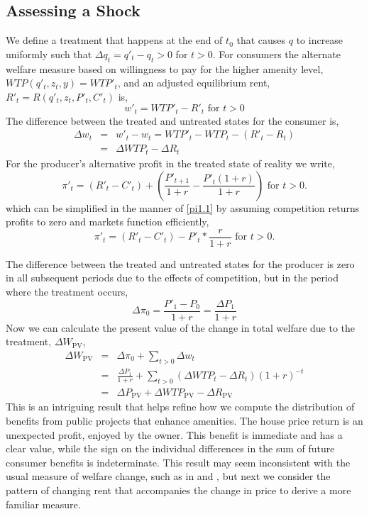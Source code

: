 \documentclass[ecta,nameyear,draft]{econsocart}
\theoremstyle{plain}
\theoremstyle{remark}
\begin{document}
\subsection{Assessing a Shock}
We define a treatment that happens at the end of $t_0$ that causes $q$ to increase uniformly such that $\Delta q_t=q'_t-q_t>0$ for $t>0$.
For consumers the alternate welfare measure based on willingness to pay for the higher amenity level,$\mathit{WTP}(q'_t,z_t,y)=\mathit{WTP'}_t$, and an adjusted equilibrium rent, $R'_t=R(q'_t,z_t,P'_t,C'_t)$ is,
\begin{equation*}
	w'_t=\mathit{WTP'}_t-R'_t \text{ for } t>0
\end{equation*}
The difference between the treated and untreated states for the consumer is,
\begin{eqnarray}
	\Delta w_t&=&w'_t-w_t=WTP'_t-WTP_t-(R'_t-R_t)\\
	&=&\Delta\mathit{WTP}_t-\Delta R_t
\end{eqnarray}
For the producer’s alternative profit in the treated state of reality we write,
\begin{equation*}
	\pi'_t = (R'_t-C'_t)+\left(\frac{P'_{t+1}}{1+r}-\frac{P'_t(1+r)}{1+r}\right)\text{ for } t>0.
\end{equation*}
which can be simplified in the manner of \ref{pi1.1} by assuming competition returns profits to zero and markets function efficiently,
\begin{equation}
\pi'_t = (R'_t-C'_t)-P'_t*\frac{r}{1+r}\text{ for } t>0.\label{pi2}
\end{equation}

The difference between the treated and untreated states for the producer is zero in all subsequent periods due to the effects of competition, but in the period where the treatment occurs,
\begin{equation}
	\Delta\pi_0=\frac{P'_1-P_0}{1+r}=\frac{\Delta P_1}{1+r}
\end{equation}
Now we can calculate the present value of the change in total welfare due to the treatment, $\Delta W_{\mathrm{PV}}$,
\begin{eqnarray}
	\Delta W_{\mathrm{PV}}&=&\Delta \pi_0+\sum_{t>0}\Delta w_t\nonumber\\
	&=&\frac{\Delta P_1}{1+r}+\sum_{t>0} (\Delta \mathit{WTP}_t-\Delta R_t)(1+r)^{-t} \label{deltaW1}\\
	&=&\Delta P_{\mathrm{PV}}+\Delta\mathit{WTP}_\mathrm{PV}-\Delta R_{\mathrm{PV}}\label{deltaW2}
\end{eqnarray}
This is an intriguing result that helps refine how we compute the distribution of benefits from public projects that enhance amenities. The house price return is an unexpected profit, enjoyed by the owner. This benefit is immediate and has a clear value, while the sign on the individual differences in the sum of future consumer benefits is indeterminate. This result may seem inconsistent with the usual measure of welfare change, such as in \cite{freeman14} and \cite{banzhaf20}, but next we consider the pattern of changing rent that accompanies the change in price to derive a more familiar measure. 
\end{document}
